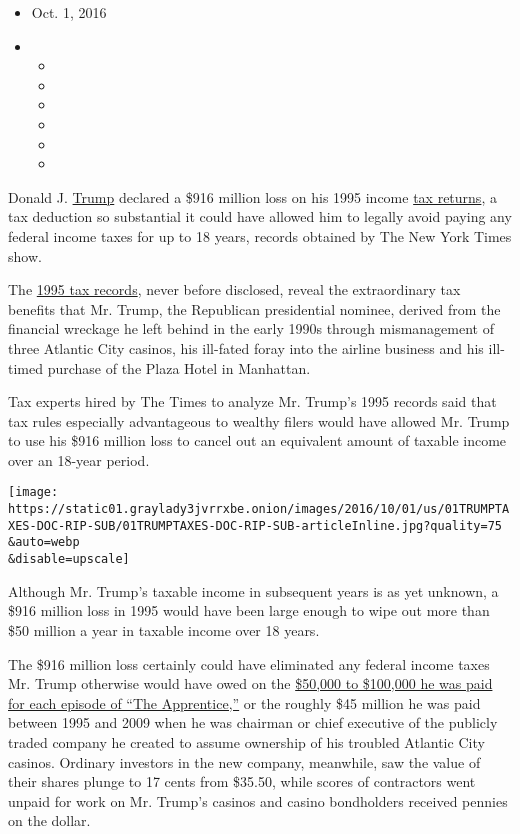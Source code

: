 \begin{itemize}
\item
  Oct. 1, 2016
\item
  \begin{itemize}
  \item
  \item
  \item
  \item
  \item
  \item
  \end{itemize}
\end{itemize}

Donald J.
\href{https://www.nytimes3xbfgragh.onion/2020/07/09/us/politics/trump-taxes.html}{Trump}
declared a \$916 million loss on his 1995 income
\href{https://www.nytimes3xbfgragh.onion/2020/07/15/nyregion/donald-trump-taxes-cyrus-vance.html}{tax
returns}, a tax deduction so substantial it could have allowed him to
legally avoid paying any federal income taxes for up to 18 years,
records obtained by The New York Times show.

The
\href{http://www.nytimes3xbfgragh.onion/interactive/2016/10/01/us/politics/donald-trump-taxes.html}{1995
tax records}, never before disclosed, reveal the extraordinary tax
benefits that Mr. Trump, the Republican presidential nominee, derived
from the financial wreckage he left behind in the early 1990s through
mismanagement of three Atlantic City casinos, his ill-fated foray into
the airline business and his ill-timed purchase of the Plaza Hotel in
Manhattan.

Tax experts hired by The Times to analyze Mr. Trump's 1995 records said
that tax rules especially advantageous to wealthy filers would have
allowed Mr. Trump to use his \$916 million loss to cancel out an
equivalent amount of taxable income over an 18-year period.

\texttt{[image: https://static01.graylady3jvrrxbe.onion/images/2016/10/01/us/01TRUMPTAXES-DOC-RIP-SUB/01TRUMPTAXES-DOC-RIP-SUB-articleInline.jpg?quality=75\\\&auto=webp\\\&disable=upscale]}

Although Mr. Trump's taxable income in subsequent years is as yet
unknown, a \$916 million loss in 1995 would have been large enough to
wipe out more than \$50 million a year in taxable income over 18 years.

The \$916 million loss certainly could have eliminated any federal
income taxes Mr. Trump otherwise would have owed on the
\href{http://www.nytimes3xbfgragh.onion/2016/07/17/business/media/donald-trump-apprentice.html?_r=1}{\$50,000
to \$100,000 he was paid for each episode of ``The Apprentice,''} or the
roughly \$45 million he was paid between 1995 and 2009 when he was
chairman or chief executive of the publicly traded company he created to
assume ownership of his troubled Atlantic City casinos. Ordinary
investors in the new company, meanwhile, saw the value of their shares
plunge to 17 cents from \$35.50, while scores of contractors went unpaid
for work on Mr. Trump's casinos and casino bondholders received pennies
on the dollar.


